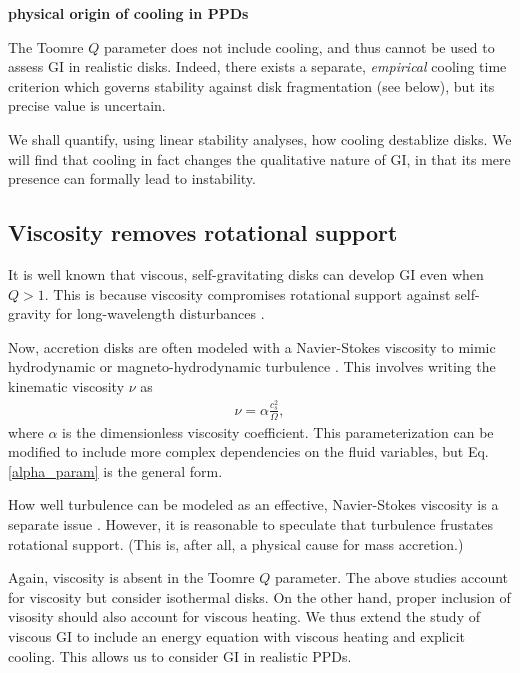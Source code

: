 \documentclass[iop, numberedappendix]{emulateapj}
\begin{document}
{\bf physical origin of cooling in PPDs}


The Toomre $Q$ parameter does not include cooling, and thus cannot be 
used to assess GI in realistic disks. Indeed, there exists a separate, 
\emph{empirical} cooling time criterion which governs stability against disk
fragmentation (see below), but its precise value is uncertain.  

We shall quantify, using linear stability analyses, how cooling 
destablize disks. We will find that cooling in fact changes the 
qualitative nature of GI, in that its mere presence can
formally lead to instability.  

\subsection{Viscosity removes rotational support}
It is well known that viscous, self-gravitating disks can develop 
GI even when $Q>1$. This is because viscosity compromises rotational
support against self-gravity for long-wavelength disturbances
\citep{lynden-bell74,willerding92,gammie96}. 

Now, accretion disks are often modeled with a Navier-Stokes viscosity
to mimic hydrodynamic or magneto-hydrodynamic turbulence
\citep{shakura73}. This involves writing the
kinematic viscosity $\nu$ as  
\begin{align}\label{alpha_param}
  \nu  = \alpha \frac{c_s^2}{\Omega}, %
\end{align}
where $\alpha$ is the dimensionless viscosity
coefficient. This
parameterization can be modified to include more complex dependencies on the
fluid variables, but Eq. \ref{alpha_param} is the general form. 

How well turbulence can be modeled as an effective, Navier-Stokes
viscosity is a separate issue \citep{balbus99}. However, it is 
reasonable to speculate that turbulence frustates rotational 
support. (This is, after all, a physical cause for mass accretion.) 

Again, viscosity is absent in the Toomre $Q$ parameter. The above
studies account for viscosity but consider isothermal disks. On the
other hand, proper inclusion of visosity should also account for
viscous heating. We thus extend the study of viscous GI to 
include an energy equation with viscous heating and explicit
cooling. This allows us to consider GI in realistic PPDs. 

\end{document}
